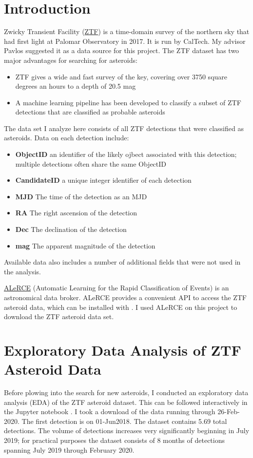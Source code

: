 \section{Introduction}
\label{section_ztf_intro}
Zwicky Transient Facility (\href{https://www.ztf.caltech.edu/}{ZTF}) is a time-domain survey of the northern sky
that had first light at Palomar Observatory in 2017.  It is run by CalTech.
My advisor Pavlos suggested it as a data source for this project.
The ZTF dataset has two major advantages for searching for asteroids:
\begin{itemize}
\item ZTF gives a wide and fast survey of the key, covering over 3750 square degrees an hours to a depth of 20.5 mag
\item A machine learning pipeline has been developed to classify a subset of ZTF detections that are classified as probable asteroids
\end{itemize}
The data set I analyze here consists of all ZTF detections that were classified as asteroids.
Data on each detection include:
\begin{itemize}
\item \textbf{ObjectID} an identifier of the likely ojbect associated with this detection; multiple detections often share the same ObjectID
\item \textbf{CandidateID} a unique integer identifier of each detection
\item \textbf{MJD} The time of the detection as an MJD
\item \textbf{RA} The right ascension of the detection
\item \textbf{Dec} The declination of the detection
\item \textbf{mag} The apparent magnitude of the detection
\end{itemize}
Available data also includes a number of additional fields that were not used in the analysis.

\href{https://github.com/alercebroker}{ALeRCE} (Automatic Learning for the Rapid Classification of Events) is an astronomical data broker.
ALeRCE provides a convenient API to access the ZTF asteroid data, which can be installed with .
I used ALeRCE on this project to download the ZTF asteroid data set.

\section{Exploratory Data Analysis of ZTF Asteroid Data}
\label{section_ztf_eda}
Before plowing into the search for new asteroids, I conducted an exploratory data analysis (EDA) of the ZTF asteroid dataset.
This can be followed interactively in the Jupyter notebook .
I took a download of the data running through 26-Feb-2020.
The first detection is on 01-Jun2018.
The dataset contains 5.69 total detections.  
The volume of detections increases very significantly beginning in July 2019; 
for practical purposes the dataset consists of 8 months of detections spanning July 2019 through February 2020.

